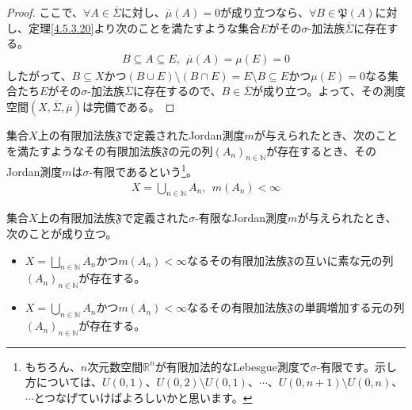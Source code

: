 \documentclass[dvipdfmx]{jsarticle}
\begin{document}
\begin{proof}
ここで、$\forall A \in \overline{\varSigma}$に対し、$\overline{\mu}(A) = 0$が成り立つなら、$\forall B\in \mathfrak{P}(A)$に対し、定理\ref{4.5.3.20}より次のことを満たすような集合$E$がその$\sigma$-加法族$\overline{\varSigma}$に存在する。
\begin{align*}
B \subseteq A \subseteq E,\ \ \overline{\mu}(A) = \mu(E) = 0
\end{align*}
したがって、$B \subseteq X$かつ$(B \cup E) \setminus (B \cap E) = E \setminus B \subseteq E$かつ$\mu(E) = 0$なる集合たち$E$がその$\sigma$-加法族$\overline{\varSigma}$に存在するので、$B \in \overline{\varSigma}$が成り立つ。よって、その測度空間$\left( X,\overline{\varSigma},\overline{\mu} \right)$は完備である。
\end{proof}
\begin{dfn}
集合$X$上の有限加法族$\mathfrak{F}$で定義されたJordan測度$m$が与えられたとき、次のことを満たすようなその有限加法族$\mathfrak{F}$の元の列$\left( A_{n} \right)_{n \in \mathbb{N}}$が存在するとき、そのJordan測度$m$は$\sigma$-有限であるという\footnote{もちろん、$n$次元数空間$\mathbb{R}^{n}$が有限加法的なLebesgue測度で$\sigma$-有限です。示し方については、$U(0,1)$、$U(0,2) \setminus U(0,1)$、$\cdots$、$U(0,n + 1) \setminus U(0,n)$、$\cdots$とつなげていけばよろしいかと思います。}。
\begin{align*}
X = \bigcup_{n \in \mathbb{N}} A_{n},\ \ m\left( A_{n} \right) < \infty
\end{align*}
\end{dfn}
\begin{thm}\label{4.5.3.22}
集合$X$上の有限加法族$\mathfrak{F}$で定義された$\sigma$-有限なJordan測度$m$が与えられたとき、次のことが成り立つ。
\begin{itemize}
\item
  $X = \bigsqcup_{n \in \mathbb{N}} A_{n}$かつ$m\left( A_{n} \right) < \infty$なるその有限加法族$\mathfrak{F}$の互いに素な元の列$\left( A_{n} \right)_{n \in \mathbb{N}}$が存在する。
\item
  $X = \bigcup_{n \in \mathbb{N}} A_{n}$かつ$m\left( A_{n} \right) < \infty$なるその有限加法族$\mathfrak{F}$の単調増加する元の列$\left( A_{n} \right)_{n \in \mathbb{N}}$が存在する。
\end{itemize}
\end{thm}
\end{document}
